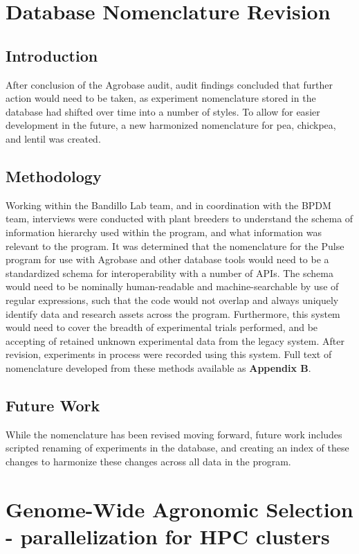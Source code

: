 \documentclass[12pt, letterpaper,oneocolumn]{article}
\begin{document}
	\section{Database Nomenclature Revision}

	\subsection{Introduction}
	After conclusion of the Agrobase audit, audit findings concluded that further action would need to be taken, as experiment nomenclature stored in the database had shifted over time into a number of styles. To allow for easier development in the future, a new harmonized nomenclature for pea, chickpea, and lentil was created.

	\subsection{Methodology}
	Working within the Bandillo Lab team, and in coordination with the BPDM team, interviews were conducted with plant breeders to understand the schema of information hierarchy used within the program, and what information was relevant to the program. It was determined that the nomenclature for the Pulse program for use with Agrobase and other database tools would need to be a standardized schema for interoperability with a number of APIs. The schema would need to be nominally human-readable and machine-searchable by use of regular expressions, such that the code would not overlap and always uniquely identify data and research assets across the program. Furthermore, this system would need to cover the breadth of experimental trials performed, and be accepting of retained unknown experimental data from the legacy system. After revision, experiments in process were recorded using this system. Full text of nomenclature developed from these methods available as \textbf{Appendix B}.

	\subsection{Future Work}
	While the nomenclature has been revised moving forward, future work includes scripted renaming of experiments in the database, and creating an index of these changes to harmonize these changes across all data in the program.

	\section{Genome-Wide Agronomic Selection - parallelization for HPC clusters}
\end{document}
